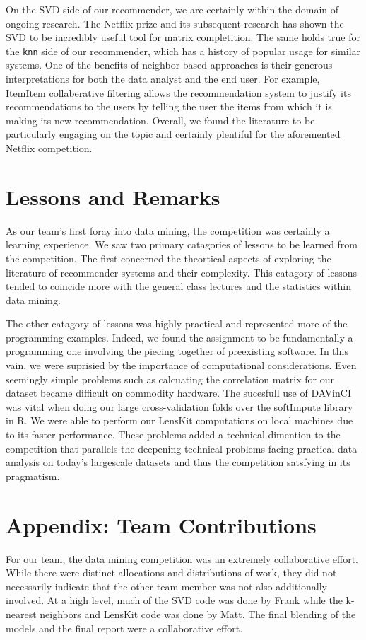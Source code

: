 \documentclass[oneside]{article}
\begin{document}
On the SVD side of our recommender, we are certainly within the domain of ongoing research. The Netflix prize and its subsequent research has shown the SVD to be incredibly useful tool for matrix completition. The same holds true for the \verb|knn| side of our recommender, which has a history of popular usage for similar systems. One of the benefits of neighbor-based approaches is their generous interpretations for both the data analyst and the end user. For example, ItemItem collaberative filtering allows the recommendation system to justify its recommendations to the users by telling the user the items from which it is making its new recommendation. Overall, we found the literature to be particularly engaging on the topic and certainly plentiful for the aforemented Netflix competition.

\section{Lessons and Remarks}
As our team's first foray into data mining, the competition was certainly a learning experience. We saw two primary catagories of lessons to be learned from the competition. The first concerned the theortical aspects of exploring the literature of recommender systems and their complexity. This catagory of lessons tended to coincide more with the general class lectures and the statistics within data mining. 

The other catagory of lessons was highly practical and represented more of the programming examples. Indeed, we found the assignment to be fundamentally a programming one involving the piecing together of preexisting software. In this vain, we were suprisied by the importance of computational considerations. Even seemingly simple problems such as calcuating the correlation matrix for our dataset became difficult on commodity hardware. The sucesfull use of DAVinCI was vital when doing our large cross-validation folds over the softImpute library in R. We were able to perform our LensKit computations on local machines due to its faster performance. These problems added a technical dimention to the competition that parallels the deepening technical problems facing practical data analysis on today's largescale datasets and thus the competition satsfying in its pragmatism. 

\section*{Appendix: Team Contributions}
For our team, the data mining competition was an extremely collaborative effort. While there were distinct allocations and distributions of work, they did not necessarily indicate that the other team member was not also additionally involved. At a high level, much of the SVD code was done by Frank while the k-nearest neighbors and LensKit code was done by Matt. The final blending of the models and the final report were a collaborative effort. 
\end{document}
